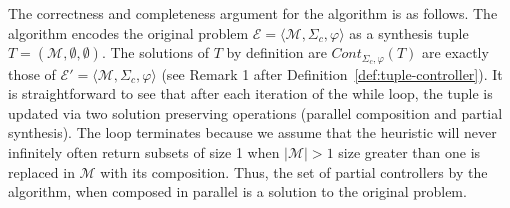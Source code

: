 The correctness and completeness argument for the algorithm is as follows. The algorithm encodes the original problem $\mathcal{E}  = \langle \mathcal{M}, \Sigma_c, \varphi \rangle$ as a synthesis tuple $T = (\mathcal{M}, \emptyset, \emptyset)$. The solutions of $T$ by definition are  $Cont_{\Sigma_c, \varphi}(T)$ are exactly those of $\mathcal{E'} = \langle \mathcal{M}, \Sigma_c, \varphi \rangle$ (see Remark 1 after Definition~\ref{def:tuple-controller}). It is straightforward to see that after each iteration of the while loop, the tuple is updated via two solution preserving operations (parallel composition and partial synthesis). The loop terminates because we assume that the heuristic will never infinitely often return subsets of size 1 when $|\mathcal{M}|>1$ size greater than one is replaced in $\mathcal{M}$ with its composition. Thus, the  set of partial controllers  by the algorithm, when composed in parallel is a solution to the original problem. 

